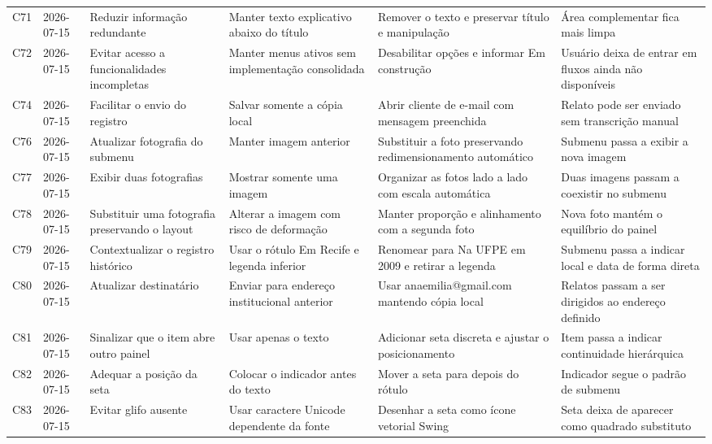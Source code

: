 \begin{landscape}
\begin{longtable}{p{1.0cm}p{1.9cm}p{4.0cm}p{5.0cm}p{6.2cm}p{5.7cm}}
\addlinespace[2pt]
C71 & 2026-07-15 & Reduzir informação redundante & Manter texto explicativo abaixo do título & Remover o texto e preservar título e manipulação & Área complementar fica mais limpa \\
\addlinespace[2pt]
C72 & 2026-07-15 & Evitar acesso a funcionalidades incompletas & Manter menus ativos sem implementação consolidada & Desabilitar opções e informar Em construção & Usuário deixa de entrar em fluxos ainda não disponíveis \\
\addlinespace[2pt]
C74 & 2026-07-15 & Facilitar o envio do registro & Salvar somente a cópia local & Abrir cliente de e-mail com mensagem preenchida & Relato pode ser enviado sem transcrição manual \\
\addlinespace[2pt]
C76 & 2026-07-15 & Atualizar fotografia do submenu & Manter imagem anterior & Substituir a foto preservando redimensionamento automático & Submenu passa a exibir a nova imagem \\
\addlinespace[2pt]
C77 & 2026-07-15 & Exibir duas fotografias & Mostrar somente uma imagem & Organizar as fotos lado a lado com escala automática & Duas imagens passam a coexistir no submenu \\
\addlinespace[2pt]
C78 & 2026-07-15 & Substituir uma fotografia preservando o layout & Alterar a imagem com risco de deformação & Manter proporção e alinhamento com a segunda foto & Nova foto mantém o equilíbrio do painel \\
\addlinespace[2pt]
C79 & 2026-07-15 & Contextualizar o registro histórico & Usar o rótulo Em Recife e legenda inferior & Renomear para Na UFPE em 2009 e retirar a legenda & Submenu passa a indicar local e data de forma direta \\
\addlinespace[2pt]
C80 & 2026-07-15 & Atualizar destinatário & Enviar para endereço institucional anterior & Usar anaemilia@gmail.com mantendo cópia local & Relatos passam a ser dirigidos ao endereço definido \\
\addlinespace[2pt]
C81 & 2026-07-15 & Sinalizar que o item abre outro painel & Usar apenas o texto & Adicionar seta discreta e ajustar o posicionamento & Item passa a indicar continuidade hierárquica \\
\addlinespace[2pt]
C82 & 2026-07-15 & Adequar a posição da seta & Colocar o indicador antes do texto & Mover a seta para depois do rótulo & Indicador segue o padrão de submenu \\
\addlinespace[2pt]
C83 & 2026-07-15 & Evitar glifo ausente & Usar caractere Unicode dependente da fonte & Desenhar a seta como ícone vetorial Swing & Seta deixa de aparecer como quadrado substituto \\

\end{longtable}
\end{landscape}
